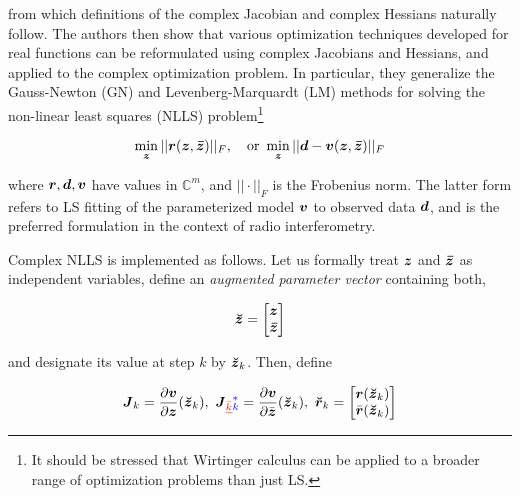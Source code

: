 \documentclass[useAMS,usenatbib]{mn2e}
\makeatletter
\newcommand{\COMPLEX}{\mathbb{C}}
\newcommand{\zz}{\bmath{z}}
\newcommand{\zzc}{\bmath{\bar z}}
\newcommand{\rr}{\bmath{r}}
\newcommand{\vv}{\bmath{v}}
\newcommand{\mat}[1]{{\bmath{#1}}}
\newcommand{\JJ}{\mat{J}} %
\newcommand{\Matrix}[2]{\left [ \begin{array}{@{}#1@{}}#2\end{array} \right ]}
\newcommand{\AUG}[1]{\bmath{\breve{#1}}}
\newcommand{\Zz}{\AUG{z}}
\newcommand{\Rr}{\AUG{r}}
\numberwithin{equation}{section} %
\providecommand{\DIFadd}[1]{{\protect\color{blue}\uwave{#1}}} %
\providecommand{\DIFdel}[1]{{\protect\color{red}\sout{#1}}}                      %
\providecommand{\DIFaddbegin}{} %
\providecommand{\DIFaddend}{} %
\providecommand{\DIFdelbegin}{} %
\providecommand{\DIFdelend}{} %
\makeatother
\begin{document}
\begin{equation}%
\DIFdelend \DIFaddbegin \end{equation}
\DIFaddend from which definitions of the complex Jacobian and complex Hessians naturally follow. The authors then show 
that various optimization techniques developed for real functions can be reformulated using 
complex Jacobians and Hessians, and applied to the complex optimization problem. In particular, they generalize 
the Gauss-Newton (GN) and Levenberg-Marquardt (LM) methods for solving the non-linear least squares (NLLS) 
problem\footnote{It should be stressed that Wirtinger calculus can be applied to a broader range of 
optimization problems than just LS.}
\DIFdelbegin %

\DIFdelend \begin{equation}
\label{eq:LSmin}
\min_{\bmath{z}} ||\bmath{r}(\zz,\zzc)||_F,~~~\mathrm{or}~\min_{\bmath{z}} ||\bmath{d}-\bmath{v}(\zz,\zzc)||_F
\end{equation}
\DIFdelbegin %

\DIFdelend where $\bmath{r},\bmath{d},\bmath{v}$ have values in $\COMPLEX^m$, and $||\cdot||_F$ is the Frobenius norm. The latter form 
refers to LS fitting of the parameterized model $\bmath{v}$ to observed data $\bmath{d}$, and is the preferred formulation
in the context of radio interferometry.

Complex NLLS is implemented as follows. Let us formally treat $\zz$ and $\zzc$ as independent variables, 
define an {\em augmented parameter vector} containing both,
\DIFdelbegin %

\DIFdelend \DIFaddbegin \begin{equation}
\DIFaddend \Zz = \Matrix{c}{\zz \\ \zzc}
\DIFdelbegin %
\end{equation}%

\begin{equation}%
\DIFdelend \DIFaddbegin \end{equation}
\DIFaddend and designate its value at step $k$ by $\Zz_k$. Then, define
\DIFdelbegin %

\DIFdelend \begin{equation}
\label{eq:Jkrk}
\JJ_k=\frac{\partial \vv}{\partial \zz} (\Zz_k), ~\JJ\DIFdelbegin \DIFdel{_{\bar{k}}}\DIFdelend \DIFaddbegin \DIFadd{_k^*}\DIFaddend =\frac{\partial \vv}{\partial \bar{\zz}}(\Zz_k),~
\Rr_k=\Matrix{c}{\rr(\Zz_k)\\\bar{\rr}(\Zz_k)}
\end{equation}
\DIFdelbegin %
\end{document}
